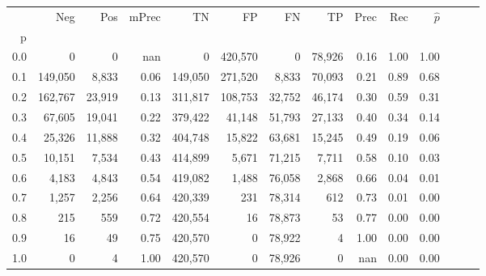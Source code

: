 \begin{tabular}{rrrrrrrrrrrrrr}
\toprule
{} &      Neg &     Pos & mPrec &       TN &       FP &      FN &      TP &  Prec &   Rec & $\hat{p}$ \\
p   &          &         &       &          &          &         &         &       &       &           \\
\midrule
0.0 &        0 &       0 &   nan &        0 &  420,570 &       0 &  78,926 &  0.16 &  1.00 &      1.00 \\
0.1 &  149,050 &   8,833 &  0.06 &  149,050 &  271,520 &   8,833 &  70,093 &  0.21 &  0.89 &      0.68 \\
0.2 &  162,767 &  23,919 &  0.13 &  311,817 &  108,753 &  32,752 &  46,174 &  0.30 &  0.59 &      0.31 \\
0.3 &   67,605 &  19,041 &  0.22 &  379,422 &   41,148 &  51,793 &  27,133 &  0.40 &  0.34 &      0.14 \\
0.4 &   25,326 &  11,888 &  0.32 &  404,748 &   15,822 &  63,681 &  15,245 &  0.49 &  0.19 &      0.06 \\
0.5 &   10,151 &   7,534 &  0.43 &  414,899 &    5,671 &  71,215 &   7,711 &  0.58 &  0.10 &      0.03 \\
0.6 &    4,183 &   4,843 &  0.54 &  419,082 &    1,488 &  76,058 &   2,868 &  0.66 &  0.04 &      0.01 \\
0.7 &    1,257 &   2,256 &  0.64 &  420,339 &      231 &  78,314 &     612 &  0.73 &  0.01 &      0.00 \\
0.8 &      215 &     559 &  0.72 &  420,554 &       16 &  78,873 &      53 &  0.77 &  0.00 &      0.00 \\
0.9 &       16 &      49 &  0.75 &  420,570 &        0 &  78,922 &       4 &  1.00 &  0.00 &      0.00 \\
1.0 &        0 &       4 &  1.00 &  420,570 &        0 &  78,926 &       0 &   nan &  0.00 &      0.00 \\
\bottomrule
\end{tabular}
